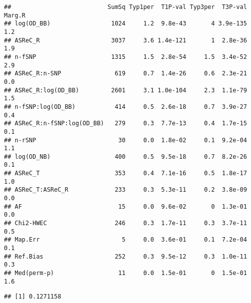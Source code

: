 \documentclass[]{article}
\newenvironment{Shaded}{\begin{snugshade}}{\end{snugshade}}
\newcommand{\KeywordTok}[1]{\textcolor[rgb]{0.13,0.29,0.53}{\textbf{#1}}}
\newcommand{\DataTypeTok}[1]{\textcolor[rgb]{0.13,0.29,0.53}{#1}}
\newcommand{\StringTok}[1]{\textcolor[rgb]{0.31,0.60,0.02}{#1}}
\newcommand{\OperatorTok}[1]{\textcolor[rgb]{0.81,0.36,0.00}{\textbf{#1}}}
\newcommand{\NormalTok}[1]{#1}
\begin{document}
\begin{Shaded}
\end{Shaded}

\begin{verbatim}
##                           SumSq Typ1per  T1P-val Typ3per  T3P-val Marg.R
## log(OD_BB)                 1024     1.2  9.8e-43       4 3.9e-135    1.2
## ASReC_R                    3037     3.6 1.4e-121       1  2.8e-36    1.9
## n-fSNP                     1315     1.5  2.8e-54     1.5  3.4e-52    2.9
## ASReC_R:n-SNP               619     0.7  1.4e-26     0.6  2.3e-21    0.0
## ASReC_R:log(OD_BB)         2601     3.1 1.0e-104     2.3  1.1e-79    1.5
## n-fSNP:log(OD_BB)           414     0.5  2.6e-18     0.7  3.9e-27    0.4
## ASReC_R:n-fSNP:log(OD_BB)   279     0.3  7.7e-13     0.4  1.7e-15    0.1
## n-rSNP                       30     0.0  1.8e-02     0.1  9.2e-04    1.1
## log(OD_NB)                  400     0.5  9.5e-18     0.7  8.2e-26    0.1
## ASReC_T                     353     0.4  7.1e-16     0.5  1.8e-17    1.0
## ASReC_T:ASReC_R             233     0.3  5.3e-11     0.2  3.8e-09    0.0
## AF                           15     0.0  9.6e-02       0  1.3e-01    0.0
## Chi2-HWEC                   246     0.3  1.7e-11     0.3  3.7e-11    0.5
## Map.Err                       5     0.0  3.6e-01     0.1  7.2e-04    0.1
## Ref.Bias                    252     0.3  9.5e-12     0.3  1.0e-11    0.3
## Med(perm-p)                  11     0.0  1.5e-01       0  1.5e-01    1.6
\end{verbatim}

\begin{Shaded}
\end{Shaded}

\begin{verbatim}
## [1] 0.1271158
\end{verbatim}

\begin{Shaded}
\end{Shaded}
\end{document}
